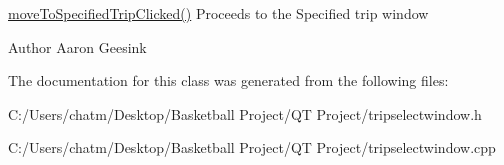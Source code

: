 \mbox{\hyperlink{class_trip_select_window_aee52b96823637577f840e23382ad89c9}{move\+To\+Specified\+Trip\+Clicked()}} Proceeds to the Specified trip window 

\begin{DoxyAuthor}{Author}
Aaron Geesink 
\end{DoxyAuthor}


The documentation for this class was generated from the following files\+:\begin{DoxyCompactItemize}
\item 
C\+:/\+Users/chatm/\+Desktop/\+Basketball Project/\+Q\+T Project/tripselectwindow.\+h\item 
C\+:/\+Users/chatm/\+Desktop/\+Basketball Project/\+Q\+T Project/tripselectwindow.\+cpp\end{DoxyCompactItemize}
